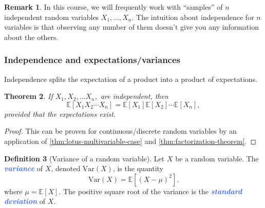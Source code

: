\documentclass[10pt]{article}
\newtheorem{theorem}{Theorem}
\theoremstyle{definition}
\newtheorem{definition}[theorem]{Definition}
\newtheorem{remark}[theorem]{Remark}
\newcommand{\1}[1]{\textbf{1}_{\left[#1\right]}} %
\def\R{\mathbb{R}} %
\def\E{\mathbb{E}} %
\def\Var{\mathrm{Var}} %
\newcommand{\demph}[1]{\textcolor{RoyalBlue}{\textbf{\slshape #1}}} %
\begin{document}
\begin{remark}
  In this course, we will frequently work with ``samples'' of $n$ independent
  random variables $X_{1},\ldots,X_{n}$. The intuition about independence for
  $n$ variables is that observing any number of them doesn't give you any
  information about the others.
\end{remark}




\subsubsection{Independence and expectations/variances}

Independence splits the expectation of a product into a product of expectations.
\begin{theorem}
  \label{thm:independence-splits-expectations}
  If $X_{1},X_{2},\ldots X_{n},$ are independent, then
  \begin{equation*}
    \E\left[X_{1}X_{2}\cdots X_{n} \right] = \E\left[X_{1} \right] \E\left[X_{2} \right] \cdots \E\left[X_{n} \right],
  \end{equation*}
  provided that the expectations exist.
\end{theorem}
\begin{proof}
  This can be proven for continuous/discrete random variables by an
  application of \cref{thm:lotus-multivariable-case} and
  \cref{thm:factorization-theorem}.
\end{proof}


\begin{definition}[Variance of a random variable]
  \label{def:variance-random-variable}
  Let $X$ be a random variable. The \demph{variance} of $X$, denoted
  $\Var(X)$, is the quantity
  \begin{equation*}
    \Var(X) = \E\left[(X-\mu)^{2} \right].
  \end{equation*}
  where $\mu= \E\left[X \right]$. The positive square root of the variance is
  the \demph{standard deviation} of $X$.
\end{definition}
\end{document}
